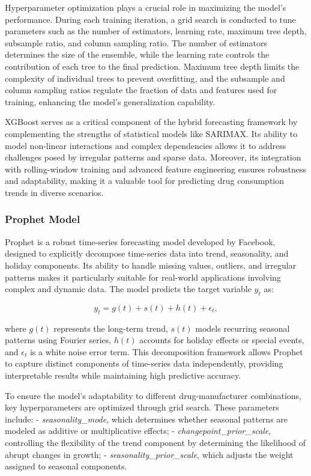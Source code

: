 \documentclass[journal]{IEEEtran}
\begin{document}
Hyperparameter optimization plays a crucial role in maximizing the model’s performance. During each training iteration, a grid search is conducted to tune parameters such as the number of estimators, learning rate, maximum tree depth, subsample ratio, and column sampling ratio. The number of estimators determines the size of the ensemble, while the learning rate controls the contribution of each tree to the final prediction. Maximum tree depth limits the complexity of individual trees to prevent overfitting, and the subsample and column sampling ratios regulate the fraction of data and features used for training, enhancing the model’s generalization capability.

XGBoost serves as a critical component of the hybrid forecasting framework by complementing the strengths of statistical models like SARIMAX. Its ability to model non-linear interactions and complex dependencies allows it to address challenges posed by irregular patterns and sparse data. Moreover, its integration with rolling-window training and advanced feature engineering ensures robustness and adaptability, making it a valuable tool for predicting drug consumption trends in diverse scenarios.


\subsubsection{Prophet Model}

Prophet is a robust time-series forecasting model developed by Facebook, designed to explicitly decompose time-series data into trend, seasonality, and holiday components. Its ability to handle missing values, outliers, and irregular patterns makes it particularly suitable for real-world applications involving complex and dynamic data. The model predicts the target variable \(y_t\) as:

\begin{equation}
y_{t} = g(t) + s(t) + h(t) + \epsilon_{t},
\end{equation}

where \(g(t)\) represents the long-term trend, \(s(t)\) models recurring seasonal patterns using Fourier series, \(h(t)\) accounts for holiday effects or special events, and \(\epsilon_{t}\) is a white noise error term. This decomposition framework allows Prophet to capture distinct components of time-series data independently, providing interpretable results while maintaining high predictive accuracy.

To ensure the model's adaptability to different drug-manufacturer combinations, key hyperparameters are optimized through grid search. These parameters include:
- \textit{seasonality\_mode}, which determines whether seasonal patterns are modeled as additive or multiplicative effects;
- \textit{changepoint\_prior\_scale}, controlling the flexibility of the trend component by determining the likelihood of abrupt changes in growth;
- \textit{seasonality\_prior\_scale}, which adjusts the weight assigned to seasonal components.
\end{document}

